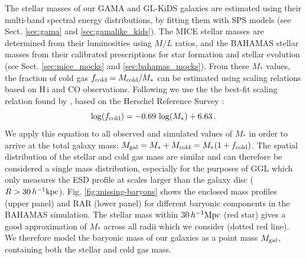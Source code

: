 \documentclass[usenatbib]{mnras}
\newcommand{\hkpc}{\, h^{-1}{\rm{kpc}} }
\newcommand{\hMpc}{\, h^{-1}{\rm{Mpc}} }
\newcommand{\un}[1]{_{\rm #1}}
\begin{document}
The stellar masses of our GAMA and GL-KiDS galaxies are estimated using their multi-band spectral energy distributions, by fitting them with SPS models (see Sect. \ref{sec:gama} and \ref{sec:gamalike_kids}). The MICE stellar masses are determined from their luminosities using \cite{bell2001} $M/L$ ratios, and the BAHAMAS stellar masses from their calibrated prescriptions for star formation and stellar evolution (see Sect. \ref{sec:mice_mocks} and \ref{sec:bahamas_mocks}). From these $M_*$ values, the fraction of cold gas $f\un{cold} = M\un{cold}/M_*$ can be estimated using scaling relations based on H\,{\sc i} and CO observations. Following \cite{brouwer2017} we use the the best-fit scaling relation found by \cite{boselli2014}, based on the  Herschel Reference Survey \cite[]{boselli2010}:
\begin{equation}\label{eq:fcold}
	\log(f\un{cold}) = -0.69 \, \log(M_*) + 6.63 \, .
\end{equation}
We apply this equation to all observed and simulated values of $M_*$ in order to arrive at the total galaxy mass: $M\un{gal} = M_* + M\un{cold} = M_* (1 + f\un{cold})$. The spatial distribution of the stellar and cold gas mass are similar \cite[]{pohlen2010,crocker2011,cooper2012,davis2013} and can therefore be considered a single mass distribution, especially for the purposes of GGL which only measures the ESD profile at scales larger than the galaxy disc ($R>30\hkpc$). Fig. \ref{fig:missing-baryons} shows the enclosed mass profiles (upper panel) and RAR (lower panel) for different baryonic components in the BAHAMAS simulation. The stellar mass within $30 \hMpc$ (red star) gives a good approximation of $M_*$ across all radii which we consider (dotted red line). We therefore model the baryonic mass of our galaxies as a point mass $M\un{gal}$, containing both the stellar and cold gas mass.
\end{document}
